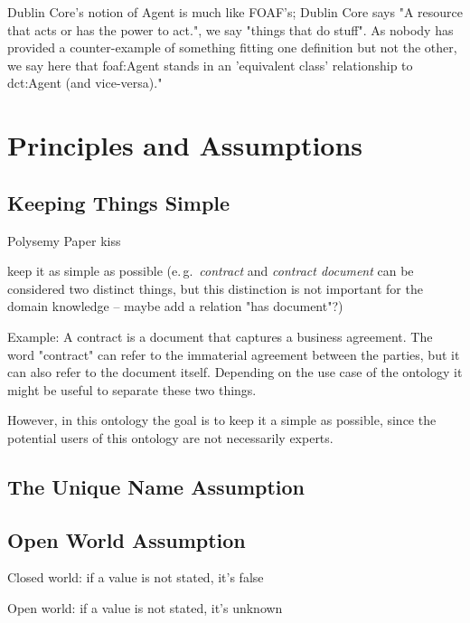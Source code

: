\documentclass[a4paper, DIV=13, BCOR=0cm]{scrbook}
\newcommand{\eg}{e.\,g.\ }
\begin{document}
Dublin Core's notion of Agent is much like FOAF's; Dublin Core says "A resource that acts or has the power to act.", we say "things that do stuff". As nobody has provided a counter-example of something fitting one definition but not the other, we say here that foaf:Agent stands in an 'equivalent class' relationship to dct:Agent (and vice-versa)." \cite[
External Vocabulary References]{Dan-Brickley2014FOAF-Vocabulary}



\section{Principles and Assumptions }
\label{general-aspects}

\subsection{Keeping Things Simple}
\label{keeping-things-simple}
Polysemy Paper \cite{arapinis2015plea}
\gls{kiss}

keep it as simple as possible (\eg \textit{contract} and \textit{contract document} can be considered two distinct things, but this distinction is not important for the domain knowledge -- maybe add a relation "has document"?)

Example: A contract is a document that captures a business agreement. The word "contract" can refer to the immaterial agreement between the parties, but it can also refer to the document itself. Depending on the use case of the ontology it might be useful to separate these two things.

However, in this ontology the goal is to keep it a simple as possible, since the potential users of this ontology are not necessarily experts.

\subsection{The Unique Name Assumption}
\cite[p.\,299]{Russell:2010aa}
\subsection{Open World Assumption}
Closed world: if a value is not stated, it's false\cite[p.\,299]{Russell:2010aa} \cite[p.\,388]{moore2015context}

Open world: if a value is not stated, it's unknown \cite[p.\,417]{Russell:2010aa} 
\end{document}

